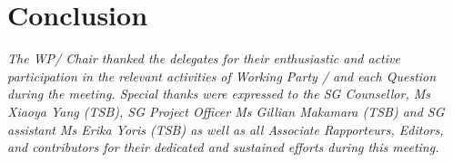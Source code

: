 
\section{Conclusion}\label{conclusion}

\textit{The WP\workingParty/\studyGroup{} Chair thanked the delegates for their enthusiastic and active participation in the relevant activities of Working Party \workingParty/\studyGroup{} and each Question during the meeting. Special thanks were expressed to the SG\studyGroup{} Counsellor, Ms Xiaoya Yang (TSB), SG\studyGroup{} Project Officer Ms Gillian Makamara (TSB) and SG\studyGroup{} assistant Ms Erika Yoris (TSB) as well as all Associate Rapporteurs, Editors, and contributors for their dedicated and sustained efforts during this meeting.}
